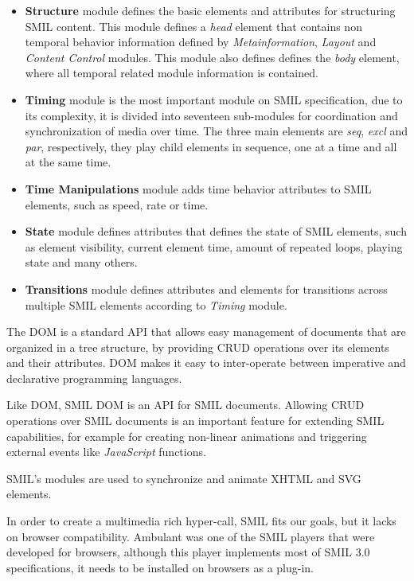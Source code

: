 \begin{itemize}
  \item \textbf{Structure} module defines the basic elements and attributes for structuring \ac{SMIL} content. This module defines a \textit{head} element that contains non temporal behavior information defined by  \textit{Metainformation}, \textit{Layout} and \textit{Content Control} modules. This module also defines defines the \textit{body} element, where all temporal related module information is contained.

  \item \textbf{Timing} module is the most important module on \ac{SMIL} specification, due to its complexity, it is divided into seventeen sub-modules for coordination and synchronization of media over time. The three main elements are \textit{seq}, \textit{excl} and \textit{par}, respectively, they play child elements in sequence, one at a time and all at the same time. 

  \item \textbf{Time Manipulations} module adds time behavior attributes to \ac{SMIL} elements, such as speed, rate or time.

  \item \textbf{State} module defines attributes that defines the state of \ac{SMIL} elements, such as element visibility, current element time, amount of repeated loops, playing state and many others.

  \item \textbf{Transitions} module defines attributes and elements for transitions across multiple \ac{SMIL} elements according to \textit{Timing} module.

\end{itemize}

The \ac{DOM} is a standard \ac{API} that allows easy management of documents that are organized in a tree structure, by providing \ac{CRUD} operations over its elements and their attributes. \ac{DOM} makes it easy to inter-operate between imperative and declarative programming languages.
  
Like \ac{DOM}, \ac{SMIL} \ac{DOM} is an \ac{API} for \ac{SMIL} documents. Allowing \ac{CRUD} operations over \ac{SMIL} documents is an important feature for extending \ac{SMIL} capabilities, for example for creating non-linear animations and triggering external events like \textit{JavaScript} functions.  


  \ac{SMIL}'s modules are used to synchronize and animate \ac{XHTML} and \ac{SVG} elements.

  In order to create a multimedia rich hyper-call, \ac{SMIL} fits our goals, but it lacks on browser compatibility. Ambulant \cite{ambulant} was one of the SMIL players that were developed for browsers, although this player implements most of \ac{SMIL} 3.0 \cite{smil3} specifications, it needs to be installed on browsers as a plug-in.

